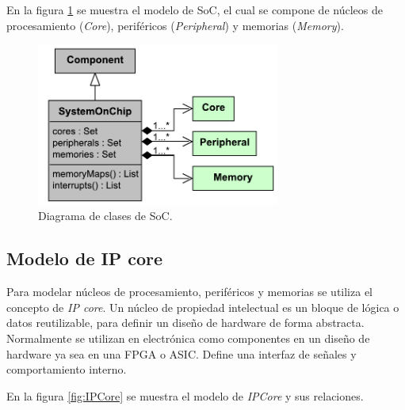 En la figura \ref{fig:ModelSoC} se muestra el modelo de SoC, el cual se compone de núcleos de procesamiento (\emph{Core}), periféricos (\emph{Peripheral}) y memorias (\emph{Memory}).

\begin{figure}[!htbp]
\begin{center}  %
\includegraphics*[width=8cm]{Figures/SoC.pdf}
\par\caption{Diagrama de clases de SoC.}\label{fig:ModelSoC}
\end{center}
\end{figure}

\subsection{Modelo de IP core}

Para modelar núcleos de procesamiento, periféricos y memorias se utiliza el concepto de \emph{IP core}. Un núcleo de propiedad intelectual es un bloque de lógica o datos reutilizable, para definir un diseño de hardware de forma abstracta. Normalmente se utilizan en electrónica como componentes en un diseño de hardware ya sea en una FPGA o ASIC. Define una interfaz de señales y comportamiento interno.

En la figura \ref{fig:IPCore} se muestra el modelo de \emph{IPCore} y sus relaciones.

